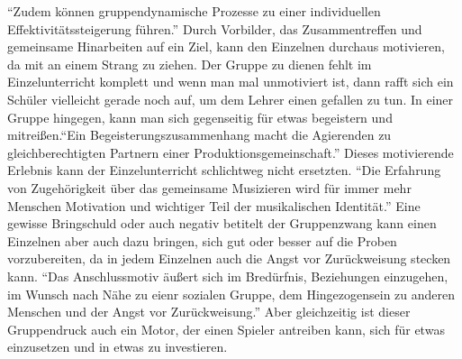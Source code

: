 \enquote{Zudem können gruppendynamische Prozesse zu einer individuellen
Effektivitätssteigerung führen.} \autocite{losert:die_kunst_zu_unterrichten}
Durch Vorbilder,
das Zusammentreffen und gemeinsame Hinarbeiten auf ein Ziel, kann den Einzelnen
durchaus motivieren, da mit an einem Strang zu ziehen. Der Gruppe zu dienen
fehlt im Einzelunterricht komplett und wenn man mal unmotiviert ist, dann rafft
sich ein Schüler vielleicht gerade noch auf, um dem Lehrer einen gefallen zu tun.
In einer Gruppe hingegen, kann man sich gegenseitig für etwas begeistern und mitreißen.\enquote{Ein Begeisterungszusammenhang macht die Agierenden
zu gleichberechtigten Partnern einer Produktionsgemeinschaft.}
\autocite[198]{busch:grundwissen_instrumentalpaedagogik} Dieses motivierende
Erlebnis kann der Einzelunterricht schlichtweg nicht ersetzten. \enquote{Die Erfahrung
von Zugehörigkeit über das gemeinsame Musizieren wird für immer mehr Menschen
Motivation und wichtiger Teil der musikalischen Identität.}
\autocite[123]{mitzscherlich:musikpsychologie} Eine gewisse Bringschuld oder
auch negativ betitelt der Gruppenzwang kann einen Einzelnen aber auch dazu
bringen, sich gut oder besser auf die Proben vorzubereiten, da in jedem
Einzelnen auch die Angst vor Zurückweisung stecken kann. \enquote{Das Anschlussmotiv
äußert sich im Bredürfnis, Beziehungen einzugehen, im Wunsch nach Nähe zu eienr
sozialen Gruppe, dem Hingezogensein zu anderen Menschen und der Angst vor
Zurückweisung.} \autocite[120ff]{losert:die_kunst_zu_unterrichten} Aber
gleichzeitig ist dieser Gruppendruck auch ein Motor, der einen Spieler antreiben
kann, sich für etwas einzusetzen und in etwas zu investieren.








